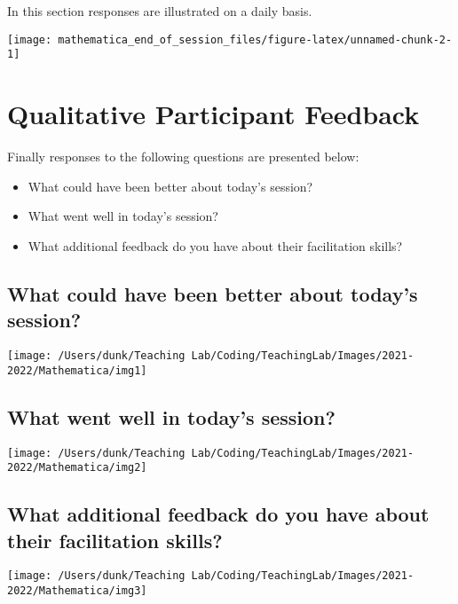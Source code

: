 \documentclass[10,a4paperpaper,]{article}
\begin{document}
In this section responses are illustrated on a daily basis.

\begin{center}\texttt{[image: mathematica\_end\_of\_session\_files/figure-latex/unnamed-chunk-2-1]} \end{center}

\section{Qualitative Participant Feedback}

Finally responses to the following questions are presented below:

\begin{itemize}
\item
  What could have been better about today's session?
\item
  What went well in today's session?
\item
  What additional feedback do you have about their facilitation skills?
\end{itemize}

\subsection{What could have been better about today's session?}

\begin{center}\texttt{[image: /Users/dunk/Teaching Lab/Coding/TeachingLab/Images/2021-2022/Mathematica/img1]} \end{center}

\subsection{What went well in today's session?}

\begin{center}\texttt{[image: /Users/dunk/Teaching Lab/Coding/TeachingLab/Images/2021-2022/Mathematica/img2]} \end{center}

\subsection{What additional feedback do you have about their facilitation skills?}

\begin{center}\texttt{[image: /Users/dunk/Teaching Lab/Coding/TeachingLab/Images/2021-2022/Mathematica/img3]} \end{center}
\end{document}
